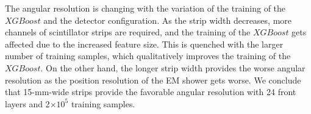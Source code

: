 \documentclass[jkps,preprint,fleqn,showpacs,showkeys]{revtex4}
\newcommand{\XGB}{XGBoost}
\begin{document}
The angular resolution is changing with the variation of the training of the $\XGB$ and the detector configuration. As the strip width decreases, more channels of scintillator strips are required, and the training of the $\XGB$ gets affected due to the increased feature size. This is quenched with the larger number of training samples, which qualitatively improves the training of the $\XGB$. On the other hand, the longer strip width provides the worse angular resolution as the position resolution of the EM shower gets worse. We conclude that 15-mm-wide strips provide the favorable angular resolution with 24 front layers and 2$\times10^{5}$ training samples.

\label{sec:con}



\begin{acknowledgments}
\end{acknowledgments}


\end{document}

